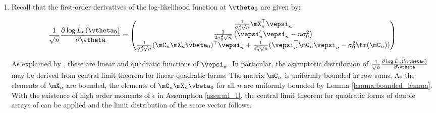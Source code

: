 \begin{subappendices}
\begin{enumerate}
   
   
   \item Recall that the first-order derivatives of the log-likelihood function at $\vtheta_0$ are given by:
   
  \begin{equation*}
   \frac{1}{\sqrt{n}}\frac{\partial \log L_n(\vtheta_0)}{\partial \vtheta} = \begin{pmatrix}
   \frac{1}{\sigma^2_0\sqrt{n}}\mX_n^\top\vepsi_n\\
   \frac{1}{2\sigma_0^4\sqrt{n}}\left(\vepsi_n'\vepsi_n - n\sigma_0^2\right) \\
   \frac{1}{\sigma_0^2\sqrt{n}}(\mC_n\mX_n\vbeta_0)^\top \vepsi_n + \frac{1}{\sigma_0^2\sqrt{n}}(\vepsi_n^\top\mC_n\vepsi_n - \sigma_0^2\tr(\mC_n))
   \end{pmatrix}
  \end{equation*}


As explained by \citet[][pag. 1905]{lee2004asymptotic}, these are linear and quadratic functions of $\vepsi_n$. In particular, the asymptotic distribution of $\frac{1}{\sqrt{n}}\frac{\partial \log L_n(\vtheta_0)}{\partial \vtheta}$ may be derived from central limit theorem for linear-quadratic forms. The matrix $\mC_n$ is uniformly bounded in row sums. As the elements of $\mX_n$ are bounded, the elements of $\mC_n\mX_n\vbeta_0$ for all $n$ are uniformly bounded by Lemma \ref{lemma:bounded_lemma}. With the existence of high order moments of $\epsilon$ in Assumption \ref{assu:ml_1}, the central limit theorem for quadratic forms of double arrays of \cite{kelejian2001asymptotic} can be applied and the limit distribution of the score vector follows.
   

\end{enumerate}
\end{subappendices}
